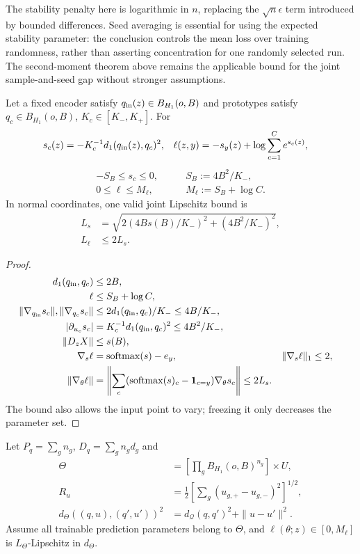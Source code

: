 The stability penalty here is logarithmic in $n$, replacing the $\sqrt n\epsilon$ term introduced by bounded differences. Seed averaging is essential for using the expected stability parameter: the conclusion controls the mean loss over training randomness, rather than asserting concentration for one randomly selected run. The second-moment theorem above remains the applicable bound for the joint sample-and-seed gap without stronger assumptions.

\begin{proposition}
Let a fixed encoder satisfy $q_{\rm in}(z)\in B_{H_1}(o,B)$ and prototypes satisfy
$q_c\in B_{H_1}(o,B)$, $K_c\in[K_-,K_+]$. For
\begin{align}
 s_c(z)&=-K_c^{-1}d_1(q_{\rm in}(z),q_c)^2,&
 \ell(z,y)&=-s_y(z)+\log\sum_{c=1}^C e^{s_c(z)},
\end{align}
\begin{align}
 -S_B\le s_c\le0,&\qquad S_B:=4B^2/K_-,\\
 0\le\ell\le M_\ell,&\qquad M_\ell:=S_B+\log C.
\end{align}
In normal coordinates, one valid joint Lipschitz bound is
\begin{align}
 L_s&=\sqrt{2(4Bs(B)/K_-)^2+(4B^2/K_-)^2},\\
 L_\ell&\le2L_s.
\end{align}
\end{proposition}
\begin{proof}
\begin{align}
 d_1(q_{\rm in},q_c)&\le2B,\\
 \ell&\le S_B+\log C,\\
 \|\nabla_{q_{\rm in}}s_c\|,\|\nabla_{q_c}s_c\|
 &\le2d_1(q_{\rm in},q_c)/K_-\le4B/K_-,\\
 |\partial_{u_c}s_c|&=K_c^{-1}d_1(q_{\rm in},q_c)^2\le4B^2/K_-,\\
 \|D_zX\|&\le s(B),\\
 \nabla_s\ell&=\operatorname{softmax}(s)-e_y,&
 \|\nabla_s\ell\|_1&\le2,\\
 \|\nabla_\theta\ell\|
 &=\left\|\sum_c(\operatorname{softmax}(s)_c-\mathbf1_{c=y})\nabla_\theta s_c\right\|\le2L_s.
\end{align}
The bound also allows the input point to vary; freezing it only decreases the parameter set.
\end{proof}

\begin{definition}
Let $P_q=\sum_g n_g$, $D_q=\sum_gn_gd_g$ and
\begin{align}
 \Theta&=\left[\prod_gB_{H_1}(o,B)^{n_g}\right]\times U,\\
 R_u&=\tfrac12\left[\sum_g(u_{g,+}-u_{g,-})^2\right]^{1/2},\\
 d_\Theta((q,u),(q',u'))^2
 &=d_{\mathcal Q}(q,q')^2+\|u-u'\|^2.
\end{align}
Assume all trainable prediction parameters belong to $\Theta$, and
$\ell(\theta;z)\in[0,M_\ell]$ is $L_\Theta$-Lipschitz in $d_\Theta$.
\end{definition}

